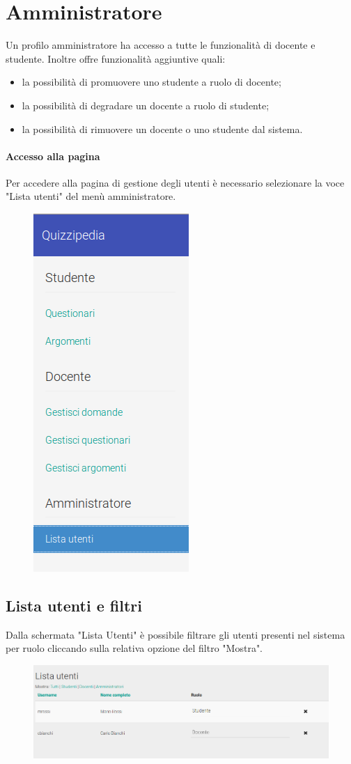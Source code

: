 \documentclass[12pt,a4paper]{article}
\begin{document}
	
		\section{Amministratore}
		Un profilo amministratore ha accesso a tutte le funzionalità di docente e studente.
		Inoltre offre funzionalità aggiuntive quali:
		\begin{itemize}
			\item la possibilità di promuovere uno studente a ruolo di docente;
			\item la possibilità di degradare un docente a ruolo di studente;
			\item la possibilità di rimuovere un docente o uno studente dal sistema.
		\end{itemize}
		\paragraph{Accesso alla pagina}
		Per accedere alla pagina di gestione degli utenti è necessario selezionare la voce "Lista utenti" del menù amministratore.
		\begin{figure}[h]
			\centering
			\includegraphics[width=0.2\linewidth]{../img/screenshot/usersList_menu.png}
			\caption{}
			\label{Lista utenti}
		\end{figure}
		\subsection{Lista utenti e filtri}
        Dalla schermata "Lista Utenti" è possibile filtrare gli utenti presenti nel sistema per ruolo cliccando sulla relativa opzione del filtro "Mostra".
		\begin{figure}[h]
			
			\centering
			\includegraphics[width=1.0\linewidth]{../img/screenshot/usersList_crop.png}
			\caption{}
			\label{Lista utenti}
		\end{figure}
\end{document}
